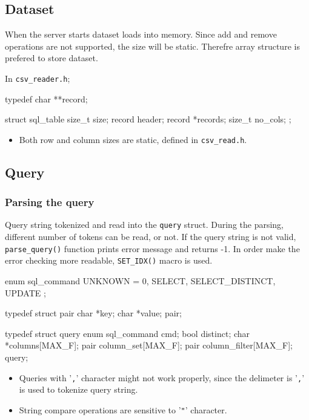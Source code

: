 \documentclass[a4paper]{article}
\begin{document}
\subsection*{Dataset}
\label{sec:org071e75a}
When the server starts dataset loads into memory. Since add and remove operations are not supported, the size will be static. Therefre array structure is  prefered to store dataset.

In \texttt{csv\_reader.h};

\begin{ccode}
typedef char **record;

struct sql_table {
  size_t size;
  record header;
  record *records;
  size_t no_cols;
};
\end{ccode}

\begin{itemize}
\item Both row and column sizes are static, defined in \texttt{csv\_read.h}.
\end{itemize}

\subsection*{Query}
\label{sec:org8288056}

\subsubsection*{Parsing the query}
\label{sec:org0cf4ea0}
Query string tokenized and read into the \texttt{query} struct.
During the parsing, different number of tokens can be read, or not.
If the query string is not valid, \texttt{parse\_query()} function prints error message and returns -1.
In order make the error checking more readable, \texttt{SET\_IDX()} macro is used. 

\begin{ccode} 
enum sql_command { UNKNOWN = 0, SELECT, SELECT_DISTINCT, UPDATE };

typedef struct pair {
  char *key;
  char *value;
} pair;

typedef struct query {
  enum sql_command cmd;
  bool distinct;
  char *columns[MAX_F];
  pair column_set[MAX_F];
  pair column_filter[MAX_F];
} query;
\end{ccode}

\begin{itemize}
\item Queries with '\texttt{,}' character might not work properly, since the delimeter is '\texttt{,}' is used to tokenize query string.
\item String compare operations are sensitive to '\texttt{"}' character.
\end{itemize}
\end{document}
